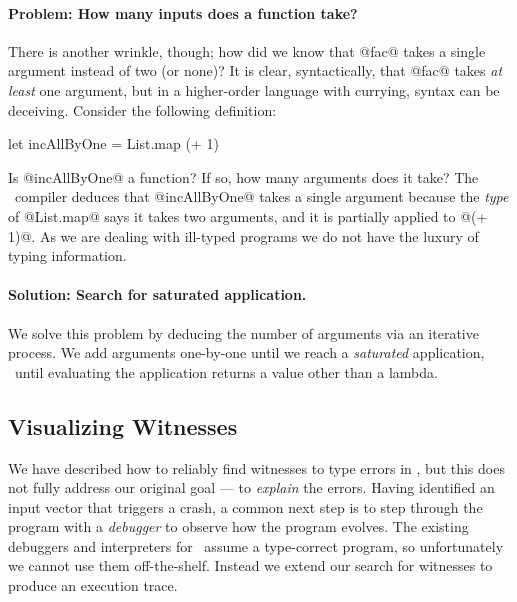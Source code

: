 \paragraph{Problem: How many inputs does a function take?}
%
There is another wrinkle, though; how did we know
that @fac@ takes a single argument instead of two
(or none)?
%
It is clear, syntactically, that @fac@ takes \emph{at least} one
argument, but in a higher-order language with currying, syntax can be
deceiving.
%
Consider the following definition:
%
\begin{code}
  let incAllByOne = List.map (+ 1)
\end{code}
%
Is @incAllByOne@ a function?
%
If so, how many arguments does it take?
%
The \ocaml\ compiler deduces that @incAllByOne@ takes a single argument
because the \emph{type} of \hbox{@List.map@} says it takes two arguments, and it is
partially applied to @(+ 1)@.
%
As we are dealing with ill-typed programs we do not have the luxury of
typing information.

\paragraph{Solution: Search for saturated application.}
We solve this problem by deducing the number of arguments
via an iterative process. We add arguments one-by-one
until we reach a \emph{saturated} application, \ie\
until evaluating the application returns a value
other than a lambda.

\subsection{Visualizing Witnesses}
\label{sec:visual-witness}
We have described how to reliably find witnesses to type errors in \ocaml,
but this does not fully address our original goal --- to \emph{explain}
the errors.
%
Having identified an input vector that triggers a crash, a common next
step is to step through the program with a \emph{debugger} to observe
how the program evolves.
%
The existing debuggers and interpreters for \ocaml\ assume a type-correct
program, so unfortunately we cannot use them off-the-shelf.
%
Instead we extend our search for witnesses to produce an execution
trace.

